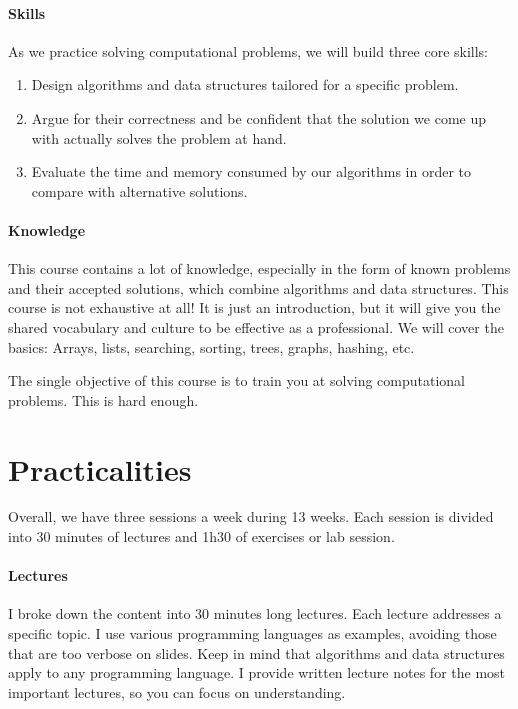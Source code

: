 \documentclass{aldast}
\begin{document}
\paragraph{Skills}
As we practice solving computational problems, we will build three
core skills:
\begin{enumerate}
\item Design algorithms and data structures tailored for a specific
  problem.
\item Argue for their correctness and be confident that the solution
  we come up with actually solves the problem at hand.
\item Evaluate the time and memory consumed by our algorithms in order
  to compare with alternative solutions.
\end{enumerate}

\paragraph{Knowledge}
This course contains a lot of knowledge, especially in the form of
known problems and their accepted solutions, which combine algorithms
and data structures. This course is not exhaustive at all! It is just
an introduction, but it will give you the shared vocabulary and
culture to be effective as a professional. We will cover the basics:
Arrays, lists, searching, sorting, trees, graphs, hashing, etc.

\begin{takeaway}
  The single objective of this course is to train you at solving
  computational problems. This is hard enough.
\end{takeaway}


\section{Practicalities}
Overall, we have three sessions a week during 13 weeks. Each session is
divided into 30 minutes of lectures and 1h30 of exercises or lab
session.

\paragraph {Lectures}
I broke down the content into 30 minutes long lectures. Each lecture
addresses a specific topic. I use various programming languages as
examples, avoiding those that are too verbose on slides. Keep in mind
that algorithms and data structures apply to any programming
language. I provide written lecture notes for the most important
lectures, so you can focus on understanding.
\end{document}
